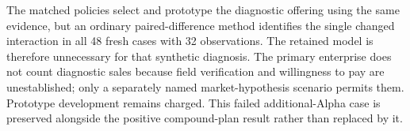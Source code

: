 The matched policies select and prototype the diagnostic offering using the same evidence, but an ordinary paired-difference method identifies the single changed interaction in all 48 fresh cases with 32 observations. The retained model is therefore unnecessary for that synthetic diagnosis. The primary enterprise does not count diagnostic sales because field verification and willingness to pay are unestablished; only a separately named market-hypothesis scenario permits them. Prototype development remains charged. This failed additional-Alpha case is preserved alongside the positive compound-plan result rather than replaced by it.
